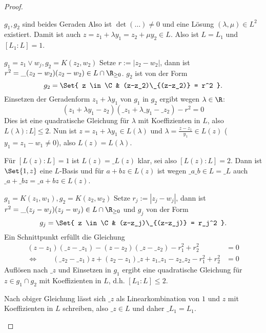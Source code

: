 \begin{st}
\begin{proof}
\begin{seg}{$g_1, g_2$ sind beides Geraden}
			Also ist $\det(\dotso) \neq 0$ und eine Lösung $(\lambda, \mu) \in L^2$ existiert.
			Damit ist auch $z = z_1 + \lambda y_1 = z_2 + \mu y_2 \in L$.
			Also ist $L = L_1$ und $[L_1 : L] = 1$.
		\end{seg}
		\begin{seg}{$g_1 = z_1 \vee w_j, g_2 = K(z_2, w_2)$}
			Setze $r := |z_2 - w_2|$, dann ist $r^2 = \_{(z_2 - w_2)}(z_2 - w_2) \in L \cap \R_{\ge 0}$.
			$g_2$ ist von der Form
			\[
				g_2 = \Set{ z \in \C & (z-z_2)\_{(z-z_2)} = r^2 }.
			\]
			Einsetzen der Geradenform $z_1 + \lambda y_1$ von $g_1$ in $g_2$ ergibt wegen $\lambda \in \R$:
			\[
				(z_1 + \lambda y_1 - z_2)(\_{z_1} + \lambda \_{y_1} - \_{z_2}) - r^2 = 0
			\]
			Dies ist eine quadratische Gleichung für $\lambda$ mit Koeffizienten in $L$, also $L(\lambda) : L] \le 2$.
			Nun ist $z = z_1 + \lambda y_1 \in L(\lambda)$ und $\lambda = \frac{z-z_1}{y_1} \in L(z)$ ($y_1 = z_1 - w_1 \neq 0$), also $L(z) = L(\lambda)$.

			Für $[L(z) : L] = 1$ ist $L(z) = \_{L(z)}$ klar, sei also $[L(z) : L] = 2$.
			Dann ist $\Set{1, z}$ eine $L$-Basis und für $a + b z \in L(z)$ ist wegen $\_{a} \_{b} \in L = \_{L}$ auch $\_{a} + \_{b}z = \_{a + b z} \in L(z)$.
		\end{seg}
		\begin{seg}{$g_1 = K(z_1, w_1), g_2 = K(z_2, w_2)$}
			Setze $r_j := |z_j - w_j|$, dann ist $r^2 = \_{(z_j - w_j)}(z_j - w_j) \in L \cap \R_{\ge 0}$ und $g_j$ von der Form
			\[
				g_j = \Set{ z \in \C & (z-z_j)\_{(z-z_j)} = r_j^2 }.
			\]
			Ein Schnittpunkt erfüllt die Gleichung
			\begin{align*}
				(z-z_1)(\_{z}-\_{z_1})-(z-z_2)(\_{z}-\_{z_2}) - r_1^2 + r_2^2 &= 0 \\
				\iff \qquad
				(\_{z_2} - \_{z_1}) z + (z_2 - z_1) \_{z} + z_1\_{z_1} - z_2\_{z_2} - r_1^2 + r_2^2 &= 0
			\end{align*}
			Auflösen nach $\_z$ und Einsetzen in $g_1$ ergibt eine quadratische Gleichung für $z \in g_1 \cap g_2$ mit Koeffizienten in $L$, d.h. $[L_1 : L] \le 2$.

			Nach obiger Gleichung lässt sich $\_{z}$ als Linearkombination von $1$ und $z$ mit Koeffizienten in $L$ schreiben, also $\_{z} \in L$ und daher $\_{L_1} = L_1$.
		\end{seg}
	\end{proof}
\end{st}

